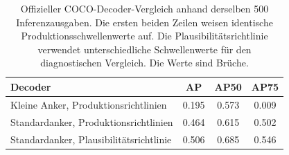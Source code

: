 \begin{table}[htbp]
\centering\small\TableSetup
\caption{Offizieller COCO-Decoder-Vergleich anhand derselben 500 Inferenzausgaben. Die ersten beiden Zeilen weisen identische Produktionsschwellenwerte auf. Die Plausibilitätsrichtlinie verwendet unterschiedliche Schwellenwerte für den diagnostischen Vergleich. Die Werte sind Brüche.}
\label{tab:evaluation:yolov7_decoder_ab}
\begin{tabularx}{\linewidth}{@{}Y S[table-format=1.3] S[table-format=1.3] S[table-format=1.3]@{}}
\toprule
\textbf{Decoder} & {\textbf{AP}} & {\textbf{AP50}} & {\textbf{AP75}} \\
\midrule
Kleine Anker, Produktionsrichtlinien & 0.195 & 0.573 & 0.009 \\
Standardanker, Produktionsrichtlinien & 0.464 & 0.615 & 0.502 \\
Standardanker, Plausibilitätsrichtlinie & 0.506 & 0.685 & 0.546 \\
\bottomrule
\end{tabularx}
\end{table}
